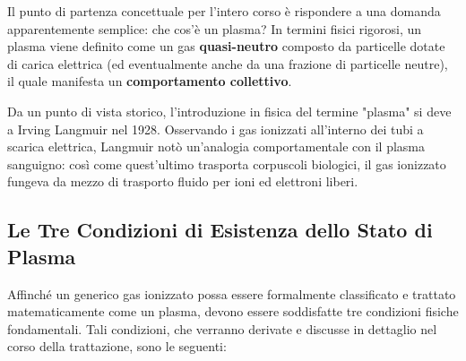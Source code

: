 Il punto di partenza concettuale per l'intero corso è rispondere a una domanda apparentemente semplice: che cos'è un plasma? In termini fisici rigorosi, un plasma viene definito come un gas \textbf{quasi-neutro} composto da particelle dotate di carica elettrica (ed eventualmente anche da una frazione di particelle neutre), il quale manifesta un \textbf{comportamento collettivo}.

Da un punto di vista storico, l'introduzione in fisica del termine "plasma" si deve a Irving Langmuir nel 1928. Osservando i gas ionizzati all'interno dei tubi a scarica elettrica, Langmuir notò un'analogia comportamentale con il plasma sanguigno: così come quest'ultimo trasporta corpuscoli biologici, il gas ionizzato fungeva da mezzo di trasporto fluido per ioni ed elettroni liberi.

\subsection{Le Tre Condizioni di Esistenza dello Stato di Plasma}

Affinché un generico gas ionizzato possa essere formalmente classificato e trattato matematicamente come un plasma, devono essere soddisfatte tre condizioni fisiche fondamentali. Tali condizioni, che verranno derivate e discusse in dettaglio nel corso della trattazione, sono le seguenti:

